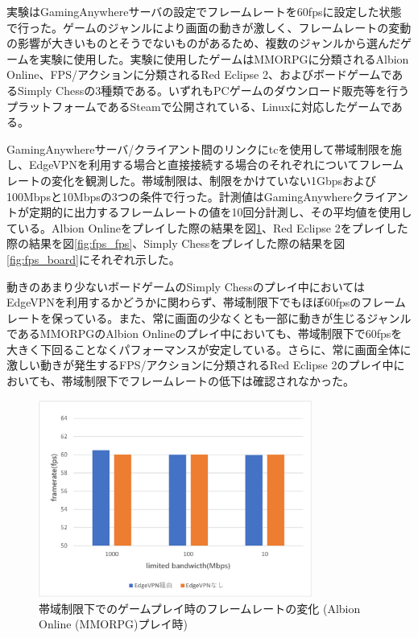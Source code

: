 実験はGamingAnywhereサーバの設定でフレームレートを60fpsに設定した状態で行った。ゲームのジャンルにより画面の動きが激しく、フレームレートの変動の影響が大きいものとそうでないものがあるため、複数のジャンルから選んだゲームを実験に使用した。実験に使用したゲームはMMORPGに分類されるAlbion Online\cite{albiononline}、FPS/アクションに分類されるRed Eclipse 2\cite{redeclipse}、およびボードゲームであるSimply Chess\cite{simplychess}の3種類である。いずれもPCゲームのダウンロード販売等を行うプラットフォームであるSteam\cite{steam}で公開されている、Linuxに対応したゲームである。

GamingAnywhereサーバ/クライアント間のリンクにtcを使用して帯域制限を施し、EdgeVPNを利用する場合と直接接続する場合のそれぞれについてフレームレートの変化を観測した。帯域制限は、制限をかけていない1Gbpsおよび100Mbpsと10Mbpsの3つの条件で行った。計測値はGamingAnywhereクライアントが定期的に出力するフレームレートの値を10回分計測し、その平均値を使用している。Albion Onlineをプレイした際の結果を図\ref{fig:fps_mmo}、Red Eclipse 2をプレイした際の結果を図\ref{fig:fps_fps}、Simply Chessをプレイした際の結果を図\ref{fig:fps_board}にそれぞれ示した。

動きのあまり少ないボードゲームのSimply Chessのプレイ中においてはEdgeVPNを利用するかどうかに関わらず、帯域制限下でもほぼ60fpsのフレームレートを保っている。また、常に画面の少なくとも一部に動きが生じるジャンルであるMMORPGのAlbion Onlineのプレイ中においても、帯域制限下で60fpsを大きく下回ることなくパフォーマンスが安定している。さらに、常に画面全体に激しい動きが発生するFPS/アクションに分類されるRed Eclipse 2のプレイ中においても、帯域制限下でフレームレートの低下は確認されなかった。

\begin{figure}[t]
    \centering
    \includegraphics[width=0.8\textwidth,keepaspectratio,clip]{img/framerate_MMO.pdf}
    \caption{帯域制限下でのゲームプレイ時のフレームレートの変化 (Albion Online (MMORPG)プレイ時)}
    \label{fig:fps_mmo}
\end{figure}

